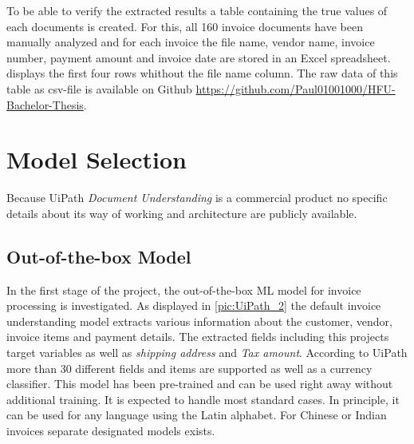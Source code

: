 To be able to verify the extracted results a table containing the true values of each documents is created.
For this, all 160 invoice documents have been manually analyzed and for each invoice the file name, vendor name, invoice number, payment amount and invoice date are stored in an Excel spreadsheet.  displays the first four rows whithout the file name column. The raw data of this table as csv-file is available on Github \url{https://github.com/Paul01001000/HFU-Bachelor-Thesis}. \\

\begin{table}[ht]
    \centering
    \caption{First 4 rows of data verification table}
    \label{tab:db}
\end{table}

\newpage
\section{Model Selection}
Because UiPath \textit{Document Understanding} is a commercial product no specific details about its way of working and architecture are publicly available.
\subsection*{Out-of-the-box Model}
In the first stage of the project, the out-of-the-box \acf{ML} model for invoice processing is investigated. As displayed in \cref{pic:UiPath_2} the default invoice understanding model extracts various information about the customer, vendor, invoice items and payment details. The extracted fields including this projects target variables as well as \textit{shipping address} and \textit{Tax amount}. According to UiPath \cite{uipathdoc} more than 30 different fields and items are supported as well as a currency classifier. This model has been pre-trained and can be used right away without additional training. It is expected to handle most standard cases. In principle, it can be used for any language using the Latin alphabet. For Chinese or Indian invoices separate designated models exists.
